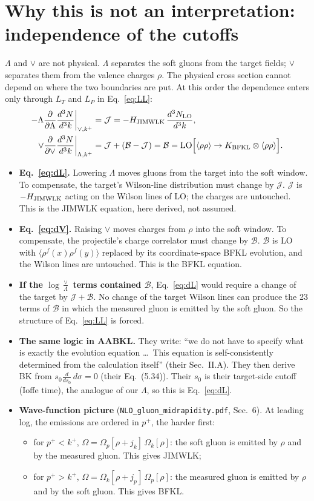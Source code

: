 \documentclass[11pt]{article}
\numberwithin{equation}{section}
\newcommand{\JJ}{\mathcal J}
\newcommand{\BB}{\mathcal B}
\newcommand{\LT}{L_T}
\newcommand{\LP}{L_P}
\begin{document}
\section{Why this is not an interpretation: independence of the cutoffs}\label{sec:cutoff}
$\Lambda$ and $\vee$ are not physical. $\Lambda$ separates the soft gluons from the target fields; $\vee$ separates them from the valence charges $\rho$. The physical cross section cannot depend on where the two boundaries are put. At this order the dependence enters only through $\LT$ and $\LP$ in Eq.~\eqref{eq:LL}:
\begin{align}
-\Lambda\frac{\partial}{\partial\Lambda}\frac{d^3N}{d^3k}\bigg|_{\vee,k^+}&=\JJ=-H_{\rm JIMWLK}\,\frac{d^3N_{\rm LO}}{d^3k},\label{eq:dL}\\
\vee\frac{\partial}{\partial\vee}\frac{d^3N}{d^3k}\bigg|_{\Lambda,k^+}&=\JJ+(\BB-\JJ)=\BB={\rm LO}\Big[\langle\rho\rho\rangle\to K_{\rm BFKL}\otimes\langle\rho\rho\rangle\Big].\label{eq:dV}
\end{align}
\begin{itemize}
\item \textbf{Eq.~\eqref{eq:dL}.} Lowering $\Lambda$ moves gluons from the target into the soft window. To compensate, the target's Wilson-line distribution must change by $\JJ$. $\JJ$ is $-H_{\rm JIMWLK}$ acting on the Wilson lines of LO; the charges are untouched. This is the JIMWLK equation, here derived, not assumed.
\item \textbf{Eq.~\eqref{eq:dV}.} Raising $\vee$ moves charges from $\rho$ into the soft window. To compensate, the projectile's charge correlator must change by $\BB$. $\BB$ is LO with $\langle\rho^f(x)\rho^f(y)\rangle$ replaced by its coordinate-space BFKL evolution, and the Wilson lines are untouched. This is the BFKL equation.
\item \textbf{If the $\log\frac\vee\Lambda$ terms contained $\BB$}, Eq.~\eqref{eq:dL} would require a change of the target by $\JJ+\BB$. No change of the target Wilson lines can produce the 23 terms of $\BB$ in which the measured gluon is emitted by the soft gluon. So the structure of Eq.~\eqref{eq:LL} is forced.
\item \textbf{The same logic in AABKL.} They write: ``we do not have to specify what is exactly the evolution equation \dots\ This equation is self-consistently determined from the calculation itself'' (their Sec.~II.A). They then derive BK from $s_0\frac{d}{ds_0}\,d\sigma=0$ (their Eq.~(5.34)). Their $s_0$ is their target-side cutoff (Ioffe time), the analogue of our $\Lambda$, so this is Eq.~\eqref{eq:dL}.
\item \textbf{Wave-function picture} (\texttt{NLO\_gluon\_midrapidity.pdf}, Sec.~6). At leading log, the emissions are ordered in $p^+$, the harder first:
\begin{itemize}
\item for $p^+<k^+$, $\Omega=\Omega_p[\rho+j_k]\,\Omega_k[\rho]$: the soft gluon is emitted by $\rho$ and by the measured gluon. This gives JIMWLK;
\item for $p^+>k^+$, $\Omega=\Omega_k[\rho+j_p]\,\Omega_p[\rho]$: the measured gluon is emitted by $\rho$ and by the soft gluon. This gives BFKL.
\end{itemize}
\end{itemize}
\end{document}
